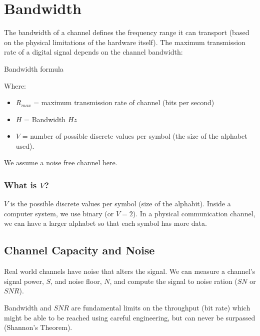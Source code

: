 \section{Bandwidth}\label{sec:bandwidth}

The bandwidth of a channel defines the frequency range it can transport (based on the physical limitations of the hardware itself).
The maximum transmission rate of a digital signal depends on the channel bandwidth:

\smallskip
\begin{highlight}{Bandwidth formula}
	\begin{minipage}{0.50\linewidth}
		\centering
	\end{minipage}
	\hfill
	\begin{minipage}{0.45\linewidth}
		Where:
		\begin{itemize}
			\item \( R_{max} \) = maximum transmission rate of channel (bits per second)
			\item \(H\) = Bandwidth \(Hz\)
			\item \(V\) = number of possible discrete values per symbol (the size of the alphabet used).
		\end{itemize}
	\end{minipage}
\end{highlight}
\begin{note}
	We assume a noise free channel here.
\end{note}

\subsubsection[What is V?]{What is \(V\)?}\label{ssub:what_is_mk}

\(V\) is the possible discrete values per symbol (size of the alphabit).
Inside a computer system, we use binary (or \(V=2\)).
In a physical communication channel, we can have a larger alphabet so that each symbol has more data.

\subsection{Channel Capacity and Noise}\label{sub:channel_capacity_and_noise}

Real world channels have noise that alters the signal.
We can measure a channel's signal power, \(S\), and noise floor, \(N\), and compute the signal to noise ration (\(SN\) or \(SNR\)).

Bandwidth and \(SNR\) are fundamental limits on the throughput (bit rate) which might be able to be reached using careful engineering, but can never be surpassed (Shannon's Theorem).
